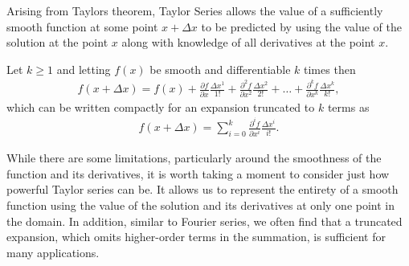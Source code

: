 Arising from Taylors theorem, Taylor Series allows the value of a sufficiently smooth function at some point $x + \Delta x$ to be predicted by using the value of the solution at the point $x$ along with knowledge of all derivatives at the point $x$.
\begin{theorem}
Let $k \geq 1$ and letting $f(x)$ be smooth and differentiable $k$ times then
\begin{align}
f(x + \Delta x) = f(x) + \frac{\partial f}{\partial x}\frac{\Delta x^1}{1!} + \frac{\partial^2 f}{\partial x^2}\frac{\Delta x^2}{2!} + \hdots + \frac{\partial^k f}{\partial x^k}\frac{\Delta x^k}{k!},
\end{align}
which can be written compactly for an expansion truncated to $k$ terms as
\begin{align}
f(x + \Delta x) = \sum_{i=0}^{k} \frac{\partial^i f}{\partial x^i}\frac{\Delta x^i}{i!}.
\end{align}
\end{theorem}
While there are some limitations, particularly around the smoothness of the function and its derivatives, it is worth taking a moment to consider just how powerful Taylor series can be. It allows us to represent the entirety of a smooth function using the value of the solution and its derivatives at only one point in the domain. In addition, similar to Fourier series, we often find that a truncated expansion, which omits higher-order terms in the summation, is sufficient for many applications.

